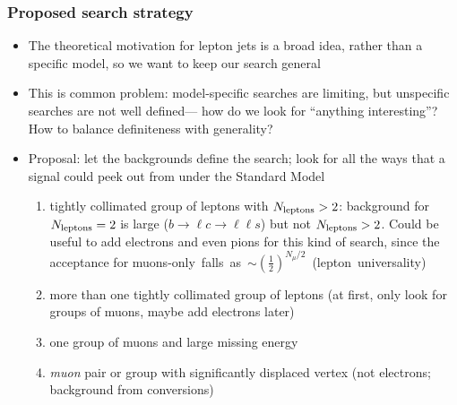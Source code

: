 \documentclass[compress]{beamer}
\begin{document}
\begin{frame}
\frametitle{Proposed search strategy}
\begin{itemize}
\item The theoretical motivation for lepton jets is a broad idea,
  rather than a specific model, so we want to keep our search general
\item This is common problem: model-specific searches are limiting,
  but unspecific searches are not well defined--- how do we look for
  ``anything interesting''?  How to balance definiteness with generality?
\item Proposal: let the backgrounds define the search; look for all
  the ways that a signal could peek out from under the Standard Model
\begin{enumerate}
\item tightly collimated group of leptons with $N_{\mbox{\scriptsize
    leptons}} > 2$: background for $N_{\mbox{\scriptsize
    leptons}} = 2$ is large ($b \to \ell c \to \ell\ell s$) but not $N_{\mbox{\scriptsize
    leptons}} > 2$.
  Could be useful to add electrons and even pions for this kind of
  search, since the acceptance for \mbox{muons-only falls as
    $\sim\left(\frac{1}{2}\right)^{N_\mu/2}$ {\scriptsize (lepton universality)}\hspace{-1 cm}}

\vspace{0.2 cm}
\item more than one tightly collimated group of leptons (at first, only look for groups of muons, maybe add electrons later)

\vspace{0.2 cm}
\item one group of muons and large missing energy

\vspace{0.2 cm}
\item {\it muon} pair or group with significantly displaced vertex (not electrons; background from conversions)
\end{enumerate}
\end{itemize}
\end{frame}
\end{document}
